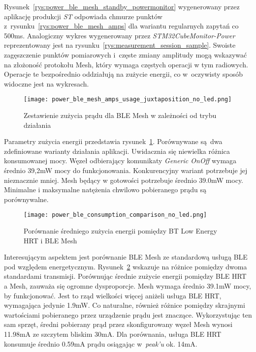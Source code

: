 Rysunek~\ref{rys:power_ble_mesh_standby_powermonitor} wygenerowany przez aplikację produkcji \textit{ST} odpowiada chmurze punktów
z~rysunku~\ref{rys:power_ble_mesh_amps} dla wariantu regularnych zapytań co 500ms. Analogiczny wykres wygenerowany 
przez \textit{STM32CubeMonitor-Power} reprezentowany jest na rysunku~\ref{rys:measurement_session_sample}.
Swoiste zagęszczenie punktów pomiarowych i~częste zmiany amplitudy mogą wskazywać na złożoność protokołu Mesh,
który wymaga częstych operacji w tym radiowych. Operacje te bezpośrednio oddziałują na zużycie energii, co w~oczywisty
sposób widoczne jest na wykresach.


\begin{figure}[!ht]
	\centering \texttt{[image: power\_ble\_mesh\_amps\_usage\_juxtaposition\_no\_led.png]} 
	\caption{Zestawienie zużycia prądu dla BLE Mesh w zależności od trybu działania}
	\label{rys:power_ble_mesh_amps_usage_juxtaposition}
\end{figure}

Parametry zużycia energii przedstawia rysunek~\ref{rys:power_ble_mesh_amps_usage_juxtaposition}. Porównywane są dwa zdefiniowane
warianty działania aplikacji. Uwidacznia się niewielka różnica konsumowanej mocy. Węzeł odbierający komunikaty \textit{Generic OnOff}
wymaga średnio 39,2mW mocy do funkcjonowania. Konkurencyjny wariant potrzebuje jej nieznacznie mniej. Mesh będący w gotowości
potrzebuje średnio 39.0mW mocy. Minimalne i maksymalne natężenia chwilowo pobieranego prądu są porównywalne.

\begin{figure}[!ht]
	\centering \texttt{[image: power\_ble\_consumption\_comparison\_no\_led.png]} 
	\caption{Porównanie średniego zużycia energii pomiędzy BT Low Energy HRT i BLE Mesh}
	\label{rys:power_ble_consumption_comparison}
\end{figure}

Interesującym aspektem jest porównanie BLE Mesh ze standardową usługą BLE pod względem energetycznym. Rysunek~\ref{rys:power_ble_consumption_comparison}
wskazuje na różnice pomiędzy dwoma standardami transmisji. Porównując średnie zużycie energii pomiędzy BLE HRT a Mesh, zauważa 
się ogromne dysproporcje. Mesh wymaga średnio 39.1mW mocy, by funkcjonować. Jest to rząd wielkości więcej aniżeli
usługa BLE HRT, wymagająca jedynie 1.9mW. Co naturalne, również różnice pomiędzy skrajnymi wartościami pobieranego
przez urządzenie prądu jest znaczące. Wykorzystując ten sam sprzęt, średni pobierany prąd przez skonfigurowany węzeł Mesh
wynosi 11.98mA ze szczytem bliskim 30mA. Dla porównania, usługa BLE HRT konsumuje średnio 0.59mA prądu osiągając
w~\textit{peak'u} ok. 14mA.

